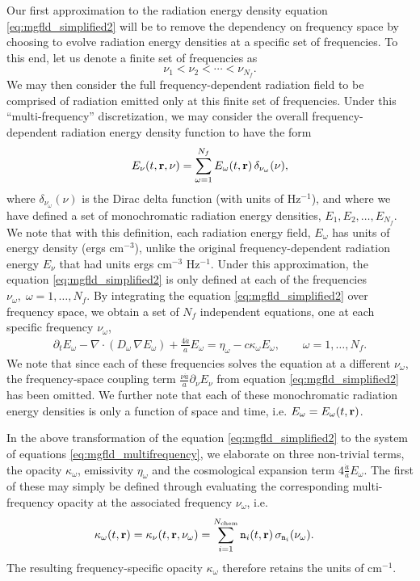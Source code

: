 \documentclass[10pt]{article}
\renewcommand{\(}{\left(}
\renewcommand{\)}{\right)}
\newcommand{\rvec}{{\bf r}}
\newcommand{\adot}{\dot{a}}
\newcommand{\Enu}{E_{\nu}}
\newcommand{\mn}{{\tt n}}
\begin{document}
Our first approximation to the radiation energy density equation
\eqref{eq:mgfld_simplified2} will be to remove the dependency on
frequency space by choosing to evolve radiation energy densities at a
specific set of frequencies.  To this end, let us denote a finite set
of frequencies as
\begin{equation}
\label{eq:multifrequency_frequencies}
  \nu_1 < \nu_2 < \cdots < \nu_{N_f}.
\end{equation}
We may then consider the full frequency-dependent radiation field to
be comprised of radiation emitted only at this finite set of
frequencies.  Under this ``multi-frequency'' discretization, we may
consider the overall frequency-dependent radiation energy density
function to have the form 
\begin{equation}
\label{eq:multifrequency_radiation}
  \Enu(t,\rvec,\nu) = \sum_{\omega=1}^{N_f} E_{\omega}(t,\rvec)\, \delta_{\nu_{\omega}}(\nu),
\end{equation}
where $\delta_{\nu_{\omega}}(\nu)$ is the Dirac delta function (with
units of Hz$^{-1}$), and where we have defined a set of monochromatic
radiation energy densities, $E_1, E_2, \ldots, E_{N_f}$.  We note that
with this definition, each radiation energy field, $E_{\omega}$ has
units of energy density (ergs cm$^{-3}$), unlike the original
frequency-dependent radiation energy $\Enu$ that had units ergs
cm$^{-3}$ Hz$^{-1}$. Under this approximation, the equation
\eqref{eq:mgfld_simplified2} is only defined at each of the
frequencies $\nu_{\omega},\;  \omega=1,\ldots,N_f$.  By integrating the
equation \eqref{eq:mgfld_simplified2} over frequency space, we obtain
a set of $N_f$ independent equations, one at each specific frequency
$\nu_{\omega}$,
\begin{align}
  \label{eq:mgfld_multifrequency}
  \partial_{t} E_{\omega} - \nabla\cdot(D_{\omega}\,\nabla E_{\omega}) + \frac{4 \adot}{a}
  E_{\omega} = \eta_{\omega} - c \kappa_{\omega} E_{\omega}, \qquad \omega=1,\ldots,N_f.
\end{align}
We note that since each of these frequencies solves the equation at a
different $\nu_{\omega}$, the frequency-space coupling term 
$\frac{\nu \adot}{a}\partial_{\nu}\Enu$ from equation
\eqref{eq:mgfld_simplified2} has been omitted.
We further note that each of these monochromatic radiation energy
densities is only a function of space and time, i.e. $E_{\omega} =
E_{\omega}(t,\rvec)$.

In the above transformation of the equation
\eqref{eq:mgfld_simplified2} to the system of equations
\eqref{eq:mgfld_multifrequency}, we elaborate on three non-trivial
terms, the opacity $\kappa_{\omega}$, emissivity $\eta_{\omega}$ and
the cosmological expansion term $4\frac{\adot}{a}E_{\omega}$. 
The first of these may simply be defined through evaluating the
corresponding multi-frequency opacity at the associated frequency
$\nu_{\omega}$, i.e.
\begin{align}
\label{eq:multifrequency_opacity}
  \kappa_{\omega}(t,\rvec) &= \kappa_{\nu}(t,\rvec,\nu_{\omega}) = \sum_{i=1}^{N_\text{chem}} \mn_i(t,\rvec)\, \sigma_{\mn_i} (\nu_{\omega}).
\end{align}
The resulting frequency-specific opacity $\kappa_{\omega}$ therefore
retains the units of cm$^{-1}$.
\end{document}
